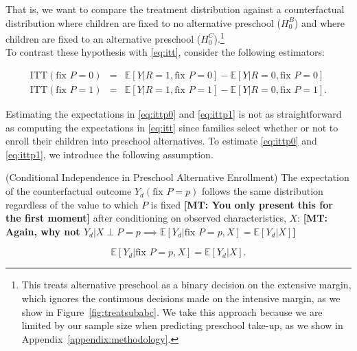 \noindent That is, we want to compare the treatment distribution against a counterfactual distribution where children are fixed to no alternative preschool ($H_{0}^B$) and where children are fixed to an alternative preschool ($H_{0}^C$).\footnote{This treats alternative preschool as a binary decision on the extensive margin, which ignores the continuous decisions made on the intensive margin, as we show in Figure~\ref{fig:treatsubabc}. We take this approach because we are limited by our sample size when predicting preschool take-up, as we show in Appendix~\ref{appendix:methodology}.}\\

\noindent To contrast these hypothesis with \eqref{eq:itt}, consider the following estimators: 

\begin{eqnarray}
\text{ITT} \left( \text{fix } P = 0 \right) &=& \mathbb{E} \left[ Y | R = 1, \text{fix } P = 0 \right] - \mathbb{E} \left[ Y | R = 0, \text{fix } P = 0 \right] \label{eq:ittp0} \\
\text{ITT} \left( \text{fix } P = 1 \right) &=& \mathbb{E} \left[ Y | R = 1, \text{fix } P = 1 \right] - \mathbb{E} \left[ Y | R = 0, \text{fix } P = 1 \right]. \label{eq:ittp1}  
\end{eqnarray}

\noindent Estimating the expectations in \eqref{eq:ittp0} and \eqref{eq:ittp1} is not as straightforward as computing the expectations in \eqref{eq:itt} since families select whether or not to enroll their children into preschool alternatives. To estimate \eqref{eq:ittp0} and \eqref{eq:ittp1}, we introduce the following assumption. \\

\begin{assumption} \normalfont \label{assumption:matching} (Conditional Independence in Preschool Alternative Enrollment) The expectation of the counterfactual outcome $Y_{d} \left( \text{fix } P=p \right)$ follows the same distribution regardless of the value to which $P$ is fixed \textbf{[MT: You only present this for the first moment]} after conditioning on observed characteristics, $X$: \textbf{[MT: Again, why not $ Y_{d} | X \perp P=p \implies \mathbb{E} \left [ Y_{d} | \text{fix } P=p, X  \right] = \mathbb{E} \left [ Y_{d} | X  \right] $]}

\begin{equation}
\mathbb{E} \left [ Y_{d} | \text{fix } P=p, X  \right] = \mathbb{E} \left [ Y_{d} | X  \right].
\end{equation}
 \end{assumption}

